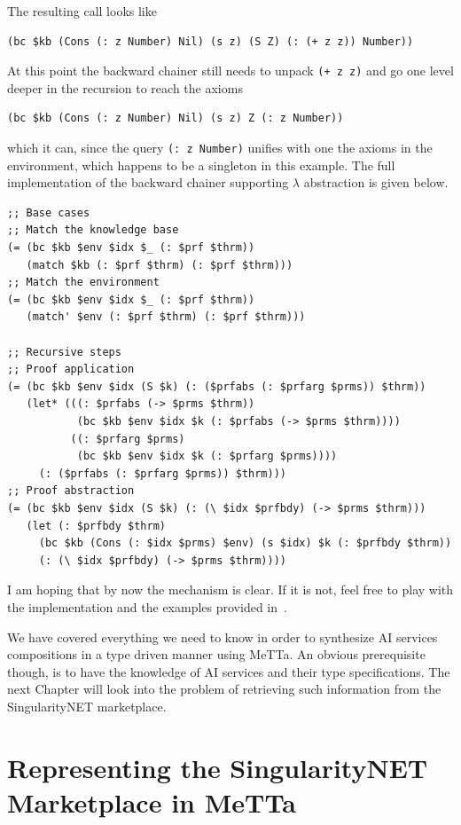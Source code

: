 \documentclass[]{report}
\begin{document}
The resulting call looks like
\begin{verbatim}
(bc $kb (Cons (: z Number) Nil) (s z) (S Z) (: (+ z z)) Number))
\end{verbatim}
At this point the backward chainer still needs to unpack
\texttt{(+ z z)} and go one level deeper in the
recursion to reach the axioms
\begin{verbatim}
(bc $kb (Cons (: z Number) Nil) (s z) Z (: z Number))
\end{verbatim}
which it can, since the query \texttt{(: z Number)}
unifies with one the axioms in the environment, which happens to be a
singleton in this example.  The full implementation of the backward
chainer supporting $\lambda$ abstraction is given below.
\begin{small}
\begin{verbatim}
;; Base cases
;; Match the knowledge base
(= (bc $kb $env $idx $_ (: $prf $thrm))
   (match $kb (: $prf $thrm) (: $prf $thrm)))
;; Match the environment
(= (bc $kb $env $idx $_ (: $prf $thrm))
   (match' $env (: $prf $thrm) (: $prf $thrm)))

;; Recursive steps
;; Proof application
(= (bc $kb $env $idx (S $k) (: ($prfabs (: $prfarg $prms)) $thrm))
   (let* (((: $prfabs (-> $prms $thrm))
           (bc $kb $env $idx $k (: $prfabs (-> $prms $thrm))))
          ((: $prfarg $prms)
           (bc $kb $env $idx $k (: $prfarg $prms))))
     (: ($prfabs (: $prfarg $prms)) $thrm)))
;; Proof abstraction
(= (bc $kb $env $idx (S $k) (: (\ $idx $prfbdy) (-> $prms $thrm)))
   (let (: $prfbdy $thrm)
     (bc $kb (Cons (: $idx $prms) $env) (s $idx) $k (: $prfbdy $thrm))
     (: (\ $idx $prfbdy) (-> $prms $thrm))))
\end{verbatim}
\end{small}
I am hoping that by now the mechanism is clear.  If it is not, feel
free to play with the implementation and the examples provided
in~\cite{ChainingLambdaAbstraction}.

We have covered everything we need to know in order to synthesize AI
services compositions in a type driven manner using MeTTa.  An obvious
prerequisite though, is to have the knowledge of AI services and their
type specifications.  The next Chapter will look into the problem of
retrieving such information from the SingularityNET marketplace.

\chapter{Representing the SingularityNET Marketplace in MeTTa}
\label{chap:marketplace}
\end{document}
